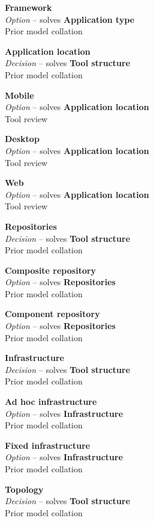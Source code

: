 \textbf{Framework} \\ \emph{Option} -- solves \textbf{Application type} \\ Prior model collation \cite{Minhas2012}

\textbf{Application location} \\ \emph{Decision} -- solves \textbf{Tool structure} \\ Prior model collation \cite{Bronsted2010a}

\textbf{Mobile} \\ \emph{Option} -- solves \textbf{Application location} \\ Tool review

\textbf{Desktop} \\ \emph{Option} -- solves \textbf{Application location} \\ Tool review

\textbf{Web} \\ \emph{Option} -- solves \textbf{Application location} \\ Tool review

\textbf{Repositories} \\ \emph{Decision} -- solves \textbf{Tool structure} \\ Prior model collation \cite{Pietschmann2010}

\textbf{Composite repository} \\ \emph{Option} -- solves \textbf{Repositories} \\ Prior model collation \cite{Pietschmann2010}

\textbf{Component repository} \\ \emph{Option} -- solves \textbf{Repositories} \\ Prior model collation \cite{Pietschmann2010}

\textbf{Infrastructure} \\ \emph{Decision} -- solves \textbf{Tool structure} \\ Prior model collation \cite{Bronsted2010a}

\textbf{Ad hoc infrastructure} \\ \emph{Option} -- solves \textbf{Infrastructure} \\ Prior model collation \cite{Bronsted2010a}

\textbf{Fixed infrastructure} \\ \emph{Option} -- solves \textbf{Infrastructure} \\ Prior model collation \cite{Bronsted2010a}

\textbf{Topology} \\ \emph{Decision} -- solves \textbf{Tool structure} \\ Prior model collation \cite{Bronsted2010a}

